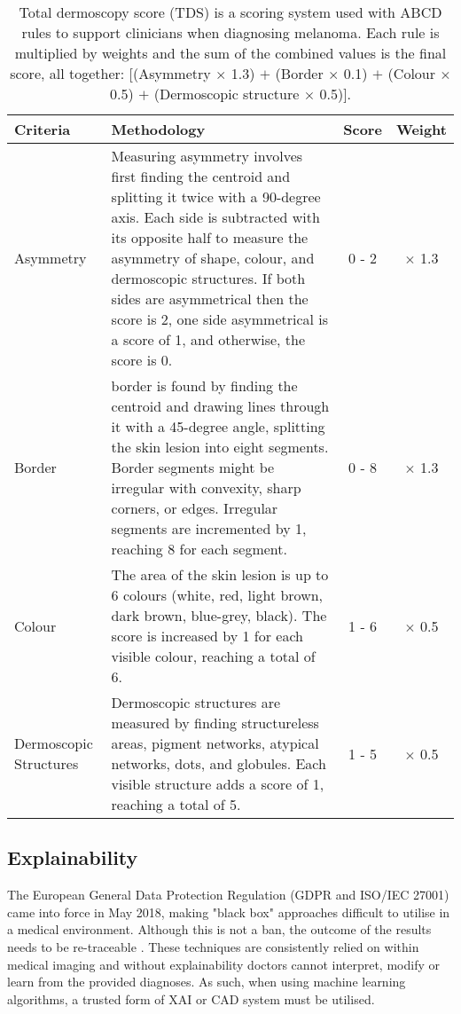 \begin{table}
\small
\begin{tabular}{|p{2.5cm}|p{10cm}|c|c|}
	\hline
	Criteria & Methodology & Score & Weight \\
	\hline
	Asymmetry & Measuring asymmetry involves first finding the centroid and splitting it twice with a 90-degree axis. Each side is subtracted with its opposite half to measure the asymmetry of shape, colour, and dermoscopic structures. If both sides are asymmetrical then the score is 2, one side asymmetrical is a score of 1, and otherwise, the score is 0. & 0 - 2 & $\times$ 1.3 
	\\
	\hline
	Border & border is found by finding the centroid and drawing lines through it with a 45-degree angle, splitting the skin lesion into eight segments. Border segments might be irregular with convexity, sharp corners, or edges. Irregular segments are incremented by 1, reaching 8 for each segment.  & 0 - 8 & $\times$ 1.3 
	\\
	\hline
	Colour & The area of the skin lesion is up to 6 colours (white, red, light brown, dark brown, blue-grey, black). The score is increased by 1 for each visible colour, reaching a total of 6. & 1 - 6 & $\times$ 0.5 
	\\
	\hline
	Dermoscopic Structures & Dermoscopic structures are measured by finding structureless areas, pigment networks, atypical networks, dots, and globules. Each visible structure adds a score of 1, reaching a total of 5. & 1 - 5 & $\times$ 0.5 
	\\
	\hline	
\end{tabular}

\caption{Total dermoscopy score (TDS) is a scoring system used with ABCD rules to support clinicians when diagnosing melanoma\cite{Cognetta1994}. Each rule is multiplied by weights and the sum of the combined values is the final score, all together: [(Asymmetry $\times$ 1.3) $+$ (Border $\times$ 0.1) $+$ (Colour $\times$ 0.5) $+$ (Dermoscopic structure $\times$ 0.5)].}
\end{table} \label{TDS}

\subsection{Explainability}
The European General Data Protection Regulation (GDPR and ISO/IEC 27001) came into force in May 2018, making "black box" approaches difficult to utilise in a medical environment. Although this is not a ban, the outcome of the results needs to be re-traceable \cite{Holzinger2017}. These techniques are consistently relied on within medical imaging and without explainability doctors cannot interpret, modify or learn from the provided diagnoses. As such, when using machine learning algorithms, a trusted form of XAI or CAD system must be utilised.

